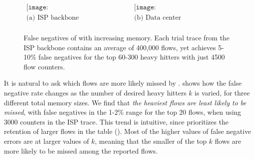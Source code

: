 \begin{figure}
  \centering
  \[
  \begin{array}{ccc}
	\texttt{[image: FalseNegsvsMsSingle.pdf]} &
	\texttt{[image: FalseNegsvsMsTheo.pdf]}
    \\
    \mbox{(a) ISP backbone} & \mbox{(b) Data center} \\
  \end{array}
  \]
\caption{False negatives of \TheSystem with increasing memory. Each trial trace
  from the ISP backbone contains an average of 400,000 flows, yet \TheSystem
  achieves 5-10\% false negatives for the top 60-300 heavy hitters with
  just 4500 flow counters.}
\label{fig:HPNegvsM}
\end{figure}



It is natural to ask which flows
are more likely missed by \TheSystem.  shows how the false
negative rate changes as the number of desired heavy hitters $k$ is varied, for
three
different total memory sizes. We find that {\em the heaviest flows are least
  likely to be missed}, \eg with false negatives in the 1-2\% range for the top
20 flows, when using 3000 counters in the ISP trace. This trend is intuitive,
since \TheSystem
prioritizes the retention of larger flows in the table
(). Most of the higher values of false negative errors are
at larger values of $k$, meaning that the smaller of the top $k$
flows are more likely to be missed among the reported flows.


